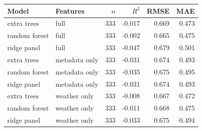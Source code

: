 \begin{tabular}{@{}llrrrr@{}}
\toprule
Model & Features & $n$ & $R^2$ & RMSE & MAE \\
\midrule
extra trees & full & 333 & -0.017 & 0.669 & 0.473 \\
random forest & full & 333 & -0.002 & 0.665 & 0.475 \\
ridge panel & full & 333 & -0.047 & 0.679 & 0.501 \\
extra trees & metadata only & 333 & -0.031 & 0.674 & 0.493 \\
random forest & metadata only & 333 & -0.035 & 0.675 & 0.495 \\
ridge panel & metadata only & 333 & -0.031 & 0.674 & 0.493 \\
extra trees & weather only & 333 & -0.008 & 0.667 & 0.472 \\
random forest & weather only & 333 & -0.011 & 0.668 & 0.475 \\
ridge panel & weather only & 333 & -0.033 & 0.675 & 0.494 \\
\bottomrule
\end{tabular}
